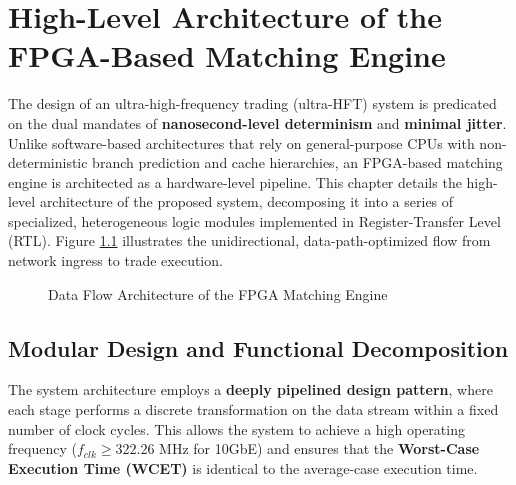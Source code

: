 \chapter{High-Level Architecture of the FPGA-Based Matching Engine}
\label{ch:architecture}

The design of an ultra-high-frequency trading (ultra-HFT) system is predicated on the dual mandates of \textbf{nanosecond-level determinism} and \textbf{minimal jitter}. Unlike software-based architectures that rely on general-purpose CPUs with non-deterministic branch prediction and cache hierarchies, an FPGA-based matching engine is architected as a hardware-level pipeline. This chapter details the high-level architecture of the proposed system, decomposing it into a series of specialized, heterogeneous logic modules implemented in Register-Transfer Level (RTL). Figure \ref{fig:matching_engine_arch} illustrates the unidirectional, data-path-optimized flow from network ingress to trade execution.

\begin{figure}
    \centering
    \caption{Data Flow Architecture of the FPGA Matching Engine}
    \label{fig:matching_engine_arch}
    
\end{figure}
\clearpage

\section{Modular Design and Functional Decomposition}

The system architecture employs a \textbf{deeply pipelined design pattern}, where each stage performs a discrete transformation on the data stream within a fixed number of clock cycles. This allows the system to achieve a high operating frequency ($f_{clk} \geq 322.26$ MHz for 10GbE) and ensures that the \textbf{Worst-Case Execution Time (WCET)} is identical to the average-case execution time.

